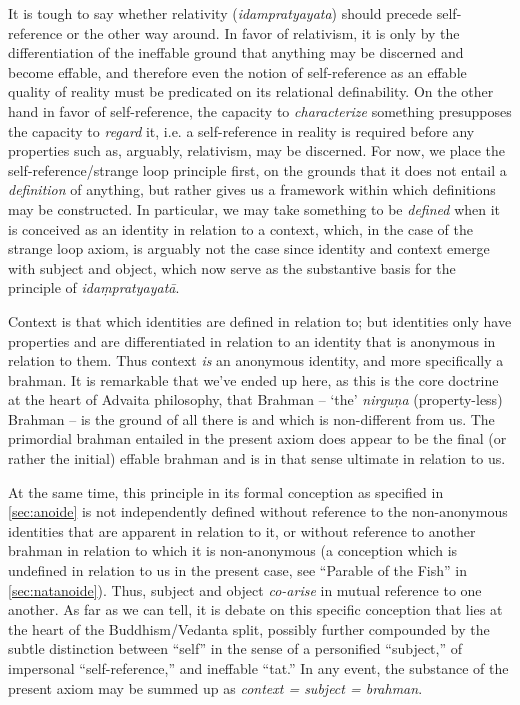 \documentclass[pra,twocolumn,groupedaddress,10pt]{revtex4}
\theoremstyle{definition}
\begin{document}
\begin{enumerate}[label={[\textbf{\arabic*}]},start=0]
		It is tough to say whether relativity (\emph{idampratyayata}) should precede self-reference or the other way around. In favor of relativism, it is only by the differentiation of the ineffable ground that anything may be discerned and become effable, and therefore even the notion of self-reference as an effable quality of reality must be predicated on its relational definability. On the other hand in favor of self-reference, the capacity to \emph{characterize} something presupposes the capacity to \emph{regard} it, i.e. a self-reference in reality is required before any properties such as, arguably, relativism, may be discerned. For now, we place the self-reference/strange loop principle first, on the grounds that it does not entail a \emph{definition} of anything, but rather gives us a framework within which definitions may be constructed. In particular, we may take something to be \emph{defined} when it is conceived as an identity in relation to a context, which, in the case of the strange loop axiom, is arguably not the case since identity and context emerge with subject and object, which now serve as the substantive basis for the principle of \emph{ida\d{m}pratyayat\={a}}.

		Context is that which identities are defined in relation to; but identities only have properties and are differentiated in relation to an identity that is anonymous in relation to them. Thus context \emph{is} an anonymous identity, and more specifically a brahman. It is remarkable that we've ended up here, as this is the core doctrine at the heart of Advaita philosophy, that Brahman -- `the' \emph{nirgu\d{n}a} (property-less) Brahman -- is the ground of all there is and which is non-different from us. The primordial brahman entailed in the present axiom does appear to be the final (or rather the initial) effable brahman and is in that sense ultimate in relation to us.

		At the same time, this principle in its formal conception as specified in \autoref{sec:anoide} is not independently defined without reference to the non-anonymous identities that are apparent in relation to it, or without reference to another brahman in relation to which it is non-anonymous (a conception which is undefined in relation to us in the present case, see ``Parable of the Fish'' in \autoref{sec:natanoide}). Thus, subject and object \emph{co-arise} in mutual reference to one another. As far as we can tell, it is debate on this specific conception that lies at the heart of the Buddhism/Vedanta split, possibly further compounded by the subtle distinction between ``self'' in the sense of a personified ``subject,'' of impersonal ``self-reference,'' and ineffable ``tat.'' In any event, the substance of the present axiom may be summed up as \emph{context = subject = brahman}.


\end{enumerate}
\end{document}
